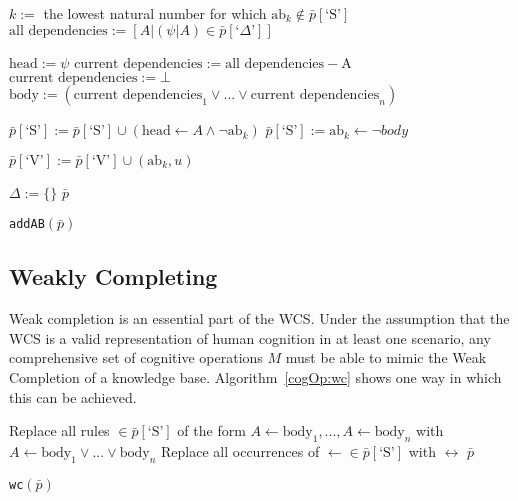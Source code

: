 \begin{algorithm}[H]
\SetAlgoLined
{}
{
{
$k:=$ the lowest natural number for which $\text{ab}_k \notin \bar{p}[\textrm{`S'}]$\;
$\text{all dependencies}:= [A | (\psi|A) \in \bar{p}[\textrm{`}\Delta\textrm{'}]]$\;

{
$\text{head}:=\psi$\;
$\text{current dependencies}:= \text{all dependencies} - \text{A}$\;
{
$\text{current dependencies}:=\bot$\;
}
$\text{body}:=(\text{current dependencies}_1 \lor ... \lor \text{current dependencies}_n)$\;

$\bar{p}[\textrm{`S'}]:= \bar{p}[\textrm{`S'}] \cup (\text{head} \leftarrow A \land \lnot \text{ab}_k)$\;
$\bar{p}[\textrm{`S'}]:= \text{ab}_k \leftarrow \lnot body$\;

}
$\bar{p}[\textrm{`V'}]:= \bar{p}[\textrm{`V'}] \cup (\text{ab}_k,u)$\;
}
$\Delta:=\{\}$\;
\Return $\bar{p}$
}
\caption{\texttt{addAB}$(\bar{p})$}
 \label{cogOp:addAB}
\end{algorithm}

\subsection{Weakly Completing}


Weak completion is an essential part of the WCS. Under the assumption that the WCS is a valid representation of human cognition in at least one scenario, any comprehensive set of cognitive operations $M$ must be able to mimic the Weak Completion of a knowledge base. Algorithm~\ref{cogOp:wc} shows one way in which this can be achieved.

\begin{algorithm}[H] 
\SetAlgoLined
{}
{
Replace all rules $\in \bar{p}[\textrm{`S'}]$ of the form $A\leftarrow \text{body}_1,...,A\leftarrow \text{body}_n$ with $A\leftarrow \text{body}_1 \lor ... \lor \text{body}_n$ \;
Replace all occurrences of $\leftarrow \in \bar{p}[\textrm{`S'}]$ with $\leftrightarrow$ \;
\Return $\bar{p}$
}

\caption{\texttt{wc}$(\bar{p})$}
\label{cogOp:wc}
\end{algorithm}



